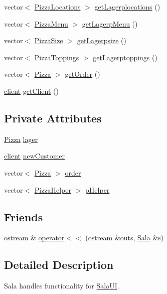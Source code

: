 \begin{CompactItemize}
vector$<$ \hyperlink{class_pizza_locations}{Pizza\-Locations} $>$ \hyperlink{class_sala_1e720a42845186f5057b36ab8b69711a}{get\-Lagerplocations} ()
\item 
vector$<$ \hyperlink{class_pizza_menu}{Pizza\-Menu} $>$ \hyperlink{class_sala_89b38b3e2a9835524c9fd21628f485cc}{get\-Lagerp\-Menu} ()
\item 
vector$<$ \hyperlink{class_pizza_size}{Pizza\-Size} $>$ \hyperlink{class_sala_3b0fc00a14ac87f5c78a4ec2f508d67b}{get\-Lagerpsize} ()
\item 
vector$<$ \hyperlink{class_pizza_toppings}{Pizza\-Toppings} $>$ \hyperlink{class_sala_aeb754b87d63d395a61539294cbdf064}{get\-Lagerptoppings} ()
\item 
vector$<$ \hyperlink{class_pizza}{Pizza} $>$ \hyperlink{class_sala_71e41a58a2a9c2d1927676693909a42c}{get\-Order} ()
\item 
\hyperlink{classclient}{client} \hyperlink{class_sala_a1300ce1d3137fc3bd1b2938612faa1b}{get\-Client} ()
\end{CompactItemize}
\subsection*{Private Attributes}
\begin{CompactItemize}
\item 
\hyperlink{class_pizza}{Pizza} \hyperlink{class_sala_0f90fe5c344e62852b747ecbdc5b5d90}{lager}
\item 
\hyperlink{classclient}{client} \hyperlink{class_sala_d6980eaf5555befe23d2271575d6d9cb}{new\-Customer}
\item 
vector$<$ \hyperlink{class_pizza}{Pizza} $>$ \hyperlink{class_sala_70a17ffa722a3985b86d30b034ad06d7}{order}
\item 
vector$<$ \hyperlink{class_pizza_helper}{Pizza\-Helper} $>$ \hyperlink{class_sala_4b1abb1f80ebc80a2334733ae62acde2}{p\-Helper}
\end{CompactItemize}
\subsection*{Friends}
\begin{CompactItemize}
\item 
ostream \& \hyperlink{class_sala_b32b27b19243c1cf7bcfffe604ea1736}{operator$<$$<$} (ostream \&outs, \hyperlink{class_sala}{Sala} \&s)
\end{CompactItemize}


\subsection{Detailed Description}
Sala handles functionality for \hyperlink{class_sala_u_i}{Sala\-UI}. 



